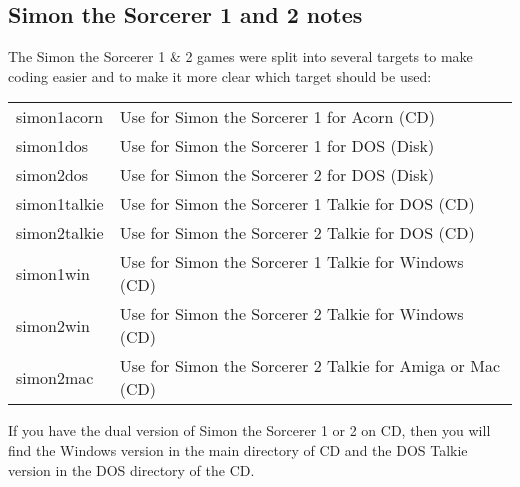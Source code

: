 \subsection{Simon the Sorcerer 1 and 2 notes}
The Simon the Sorcerer 1 \& 2 games were split into several targets to make
coding easier and to make it more clear which target should be used:

\begin{tabular}{ll}
       simon1acorn  & Use for Simon the Sorcerer 1 for Acorn (CD)\\
       simon1dos    & Use for Simon the Sorcerer 1 for DOS (Disk)\\
       simon2dos    & Use for Simon the Sorcerer 2 for DOS (Disk)\\
       simon1talkie & Use for Simon the Sorcerer 1 Talkie for DOS (CD)\\
       simon2talkie & Use for Simon the Sorcerer 2 Talkie for DOS (CD)\\
       simon1win    & Use for Simon the Sorcerer 1 Talkie for Windows (CD)\\
       simon2win    & Use for Simon the Sorcerer 2 Talkie for Windows (CD)\\
       simon2mac    & Use for Simon the Sorcerer 2 Talkie for Amiga or Mac (CD)\\
\end{tabular}

If you have the dual version of Simon the Sorcerer 1 or 2 on CD,
then you will find the Windows version in the main directory of CD
and the DOS Talkie version in the DOS directory of the CD.
